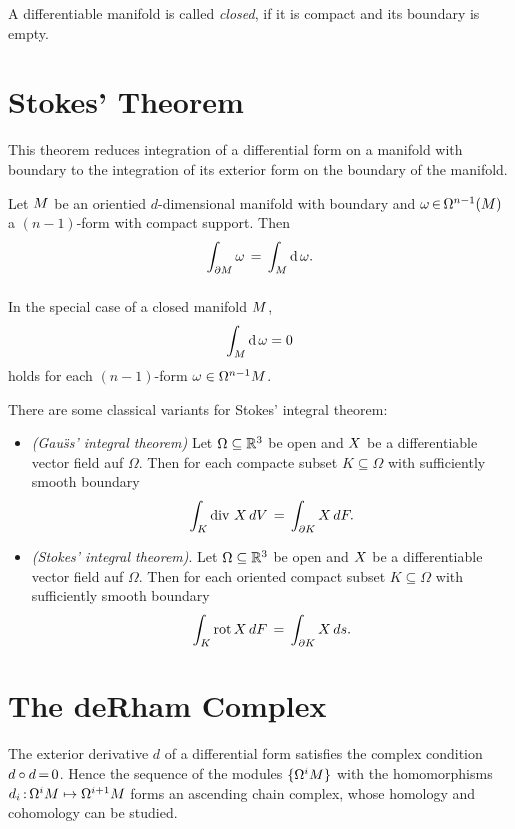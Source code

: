 \documentclass[11pt,twoside]{article}
\begin{document}
\begin{definition}
A differentiable manifold is called \textit{closed},
if it is compact and its boundary is empty.
\end{definition}

\section{Stokes' Theorem}
This theorem reduces integration of a differential form
on a manifold with boundary to the integration of its exterior form
on the boundary of the manifold.

\begin{theorem}
Let ${M}$ be an orientied $d$-dimensional manifold with boundary and
$\omega {\,\in\,} \Omega^{n-1}({M})$ a $(n-1)$-form with compact support.
Then
\[
\int_{\partial {M}} \omega \, = \, \int_{{M}} \operatorname{d} \omega.
\]
\end{theorem}

\subparagraph{}
In the special case of a closed manifold ${M}$,
\[
\int_{{M}} \operatorname{d} \omega = 0
\]
holds for each $(n{-}1)$-form $\omega \in \Omega^{n-1} {M}$.

\begin{examples}
There are some classical variants for Stokes' integral theorem:

\begin{itemize}[leftmargin=15pt]
\item[1.]
\textit{({Gau\"ss}' integral theorem)}
Let $\Omega \subseteq {\mathbb{R}}^3$ be open
and $X$ be a differentiable vector field auf $\Omega$.
Then for each compacte subset $K \subseteq \Omega$ with sufficiently
smooth boundary
\[
\int_K \operatorname{div} \, X \, dV \,=\, \int_{\partial K} X \, dF.
\]

\item[2.]
\textit{({Stokes}' integral theorem)}.
Let $\Omega \subseteq {\mathbb{R}}^3$ be open
and $X$ be a differentiable vector field auf $\Omega$.
Then for each oriented compact subset $K \subseteq \Omega$ with
sufficiently smooth boundary
\[
\int_{K} \operatorname{rot} X \, dF \,=\, \int_{\partial K} X \, ds.
\]
\end{itemize}
\end{examples}

\section{The deRham Complex}
The exterior derivative $d$ of a differential form satisfies
the complex condition $d \circ d {\,=\,} 0$.
Hence the sequence of the modules $\{\Omega^i {M}\}$ with the
homomorphisms $d_i {\,:\,}\Omega^i {M} \mapsto \Omega^{i+1} {M}$
forms an ascending chain complex,
whose homology and cohomology can be studied.
\end{document}
